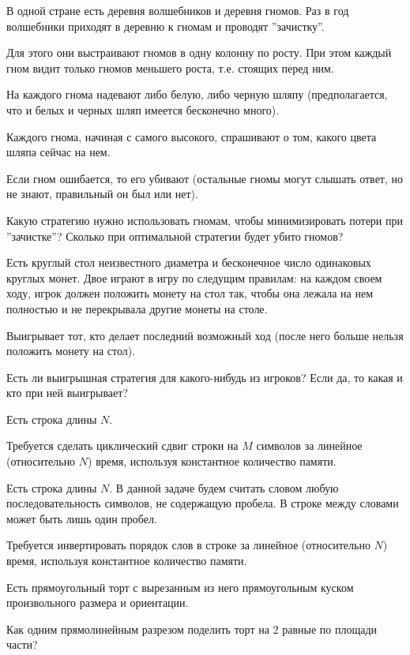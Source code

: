 \begin{problem}

В одной стране есть деревня волшебников и деревня гномов.
Раз в год волшебники приходят в деревню к гномам и проводят ''зачистку''.

Для этого они выстраивают гномов в одну колонну по росту. При этом каждый гном видит только гномов меньшего роста, т.е. стоящих перед ним. 

На каждого гнома надевают либо белую, либо черную шляпу (предполагается, что и белых и черных шляп имеется бесконечно много).

Каждого гнома, начиная с самого высокого, спрашивают о том, какого цвета шляпа сейчас на нем.

Если гном ошибается, то его убивают (остальные гномы могут слышать ответ, но не знают, правильный он был или нет).

Какую стратегию нужно использовать гномам, чтобы минимизировать потери при ''зачистке''?
Сколько при оптимальной стратегии будет убито гномов?

\end{problem}
\begin{problem}

Есть круглый стол неизвестного диаметра и бесконечное число одинаковых круглых монет. Двое играют в игру по следущим правилам: на каждом своем ходу, игрок должен положить монету на стол так, чтобы она лежала на нем полностью и не перекрывала другие монеты на столе.

Выигрывает тот, кто делает последний возможный ход (после него больше нельзя положить монету на стол). 

Есть ли выигрышная стратегия для какого-нибудь из игроков?
Если да, то какая и кто при ней выигрывает?

\end{problem}
\begin{problem}

Есть строка длины $N$.

Требуется сделать циклический сдвиг строки на $M$ символов за линейное (относительно $N$) время, используя константное количество памяти.

\end{problem}
\begin{problem}

Есть строка длины $N$. В данной задаче будем считать словом любую последовательность символов, не содержащую пробела. В строке между словами может быть лишь один пробел.

Требуется инвертировать порядок слов в строке за линейное (относительно $N$) время, используя константное количество памяти.

\end{problem}
\begin{problem}

Есть прямоугольный торт с вырезанным из него прямоугольным куском произвольного размера и ориентации.

Как одним прямолинейным разрезом поделить торт на 2 равные по площади части?
\end{problem}
